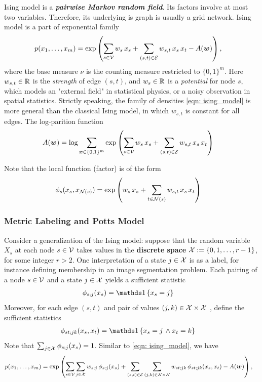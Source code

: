 \documentclass[11pt]{article}
\begin{document}
Ising model is a \textbf{\emph{pairwise Markov random field}}. Its factors involve at most two variables. Therefore, its underlying is graph is usually a grid network. Ising model is a part of exponential family 
\begin{align}
p(x_1, \ldots, x_m) &= \exp\left(\sum_{s\in {\mathcal V}}w_s\,x_s + \sum_{(s,t) \in {\mathcal E}}w_{s,t}\,x_s\,x_t - A(\boldsymbol{w})\right), \label{eqn: ising_model}
\end{align} where the base measure $\nu$ is the counting measure restricted to $\{0,1\}^m.$ Here $w_{s,t} \in {\mathbb R}$ is the \emph{strength} of edge $(s,t)$, and $w_s \in {\mathbb R}$ is a \emph{potential} for node $s$, which models an "external field" in statistical physics, or a noisy observation in spatial statistics. Strictly speaking, the family of
densities \eqref{eqn: ising_model} is more general than the classical Ising model, in which $w_{s,t}$ is constant for all edges. The log-parition function 
\begin{align*}
A(\boldsymbol{w}) &= \log \sum_{\boldsymbol{x} \in \{0,1\}^m}\exp\left(\sum_{s\in {\mathcal V}}w_s\,x_s + \sum_{(s,t) \in {\mathcal E}}w_{s,t}\,x_s\,x_t\right)
\end{align*}

Note that the local function (factor) is of the form
\begin{align*}
\phi_{s}(x_s, x_{{\mathcal N}(s)}) &=  \exp\left(w_s\,x_s + \sum_{t\in {\mathcal N}(s)}w_{s,t}\,x_s\,x_t\right)
\end{align*} 

\subsubsection{Metric Labeling and Potts Model}
Consider a generalization of the Ising model: suppose that the random variable $X_s$ at each node $s \in {\mathcal V}$ takes values in the \textbf{discrete space} ${\mathcal X} := \{0,1, \ldots, r-1\}$, for some integer $r > 2$. One interpretation of a state $j \in {\mathcal X}$ is as a label, for instance defining membership in an image segmentation problem. Each pairing of a node $s \in {\mathcal V}$ and a state $j \in {\mathcal X}$ yields a sufficient statistic 
\begin{align}
\phi_{s;j}(x_s) &= \ind{x_s = j}  \label{eqn: metric_label_sufficient}
\end{align} 
Moreover, for each edge $(s,t)$ and pair of values $(j,k) \in {\mathcal X} \times {\mathcal X}$ , define the sufficient statistics
\begin{align}
\phi_{st;jk}(x_s, x_t) &= \ind{x_s = j \, \land x_{t} = k}  \label{eqn: metric_label_sufficient2}
\end{align} Note that $\sum_{j\in {\mathcal X}}\phi_{s;j}(x_s) = 1$.  Similar to \eqref{eqn: ising_model}, we have 
\begin{align}
p(x_1, \ldots, x_m) &= \exp\left(\sum_{s\in {\mathcal V}}\sum_{j \in {\mathcal X}}w_{s;j}\,\phi_{s;j}(x_s)  + \sum_{(s,t) \in {\mathcal E}}\sum_{(j,k) \in {\mathcal X} \times {\mathcal X}}w_{st;jk}\,\phi_{st;jk}(x_s, x_t)  - A(\boldsymbol{w})\right), \label{eqn: potts_model}
\end{align} 
\end{document}
